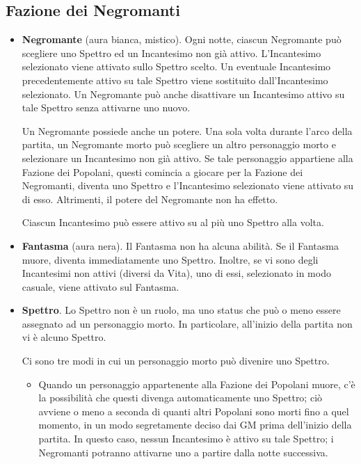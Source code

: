 \documentclass[a4paper,10pt]{article}
\begin{document}
\subsection*{Fazione dei Negromanti}
\label{negromanti}

\begin{itemize}

	\item {\bf Negromante} (aura bianca, mistico). Ogni notte, ciascun Negromante può scegliere uno Spettro ed un Incantesimo non già attivo. L'Incantesimo selezionato viene attivato sullo Spettro scelto.
	Un eventuale Incantesimo precedentemente attivo su tale Spettro viene sostituito dall'Incantesimo selezionato.
	Un Negromante può anche disattivare un Incantesimo attivo su tale Spettro senza attivarne uno nuovo.
	
	Un Negromante possiede anche un potere. Una sola volta durante l'arco della partita, un Negromante morto può scegliere un altro personaggio morto e selezionare un Incantesimo non già attivo. Se tale personaggio appartiene alla Fazione dei Popolani, questi comincia a giocare per la Fazione dei Negromanti, diventa uno Spettro e l'Incantesimo selezionato viene attivato su di esso. Altrimenti, il potere del Negromante non ha effetto.
	
	Ciascun Incantesimo può essere attivo su al più uno Spettro alla volta.
 
	\item {\bf Fantasma} (aura nera). Il Fantasma non ha alcuna abilità. Se il Fantasma muore, diventa immediatamente uno Spettro. Inoltre, se vi sono degli Incantesimi non attivi (diversi da Vita), uno di essi, selezionato in modo casuale, viene attivato sul Fantasma.

	\item {\bf Spettro}. Lo Spettro non è un ruolo, ma uno status che può o meno essere assegnato ad un personaggio morto. In particolare, all'inizio della partita non vi è alcuno Spettro.
	
	Ci sono tre modi in cui un personaggio morto può divenire uno Spettro.
	
	\begin{itemize}
		\item Quando un personaggio appartenente alla Fazione dei Popolani muore, c'è la possibilità che questi divenga automaticamente uno Spettro; ciò avviene o meno a seconda di quanti altri Popolani sono morti fino a quel momento, in un modo segretamente deciso dai GM prima dell'inizio della partita. In questo caso, nessun Incantesimo è attivo su tale Spettro; i Negromanti potranno attivarne uno a partire dalla notte successiva.
		

\end{itemize}
\end{itemize}
\end{document}
